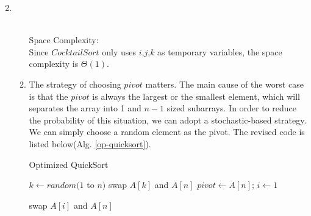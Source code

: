 \documentclass[12pt,a4paper]{article}
\makeatletter
\newtheorem*{solution}{Solution}
\theoremstyle{definition}
\renewenvironment{solution}[1][Solution] {\par\pushQED{\qed}\normalfont\topsep6\p@\@plus6\p@\relax\trivlist\item[\hskip\labelsep\bfseries#1\@addpunct{.}]\ignorespaces}{\popQED\endtrivlist\@endpefalse} \makeatother
\makeatother
\begin{document}
\begin{enumerate}
\begin{solution}
\begin{enumerate}
       ~\\
       Space Complexity:\\
       Since $CocktailSort$ only uses $i$,$j$,$k$ as temporary variables, the space complexity is $\Theta(1)$.
       \item
       The strategy of choosing $pivot$ matters. The main cause of the worst case is that the $pivot$ is always the largest or the smallest element, which will separates the array into 1 and $n−1$ sized subarrays. In order to reduce the probability of this situation, we can adopt a stochastic-based strategy. We can simply choose a random element as the pivot. The revised code is listed below(Alg. \ref{op-quicksort}).
       
       \begin{minipage}[t]{0.88\textwidth}
	    \begin{algorithm}[H]
		
		\BlankLine
		\caption{Optimized QuickSort}\label{op-quicksort}
	
		$k \leftarrow random(1$ to  $n)$\;
		swap $A[k]$ and $A[n]$\;
		$pivot \leftarrow A[n]$; $i \leftarrow 1$\;
		
		swap $A[i]$ and $A[n]$\;
	    \end{algorithm}
        \end{minipage}
       \end{enumerate}
    \end{solution}
    


\end{enumerate}
\end{document}
